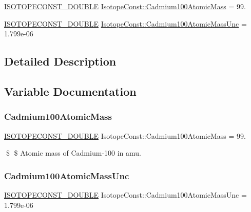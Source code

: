 \begin{DoxyCompactItemize}
\item 
\mbox{\hyperlink{group___isotope_const-_macros_ga8f45a7272ce02c0b4c65c44636ed719a}{I\+S\+O\+T\+O\+P\+E\+C\+O\+N\+S\+T\+\_\+\+D\+O\+U\+B\+LE}} \mbox{\hyperlink{group___isotope_const-_cadmium-_cd100_ga24c75fd2b6135de354e0e939f84f84c7}{Isotope\+Const\+::\+Cadmium100\+Atomic\+Mass}} = 99.
\item 
\mbox{\hyperlink{group___isotope_const-_macros_ga8f45a7272ce02c0b4c65c44636ed719a}{I\+S\+O\+T\+O\+P\+E\+C\+O\+N\+S\+T\+\_\+\+D\+O\+U\+B\+LE}} \mbox{\hyperlink{group___isotope_const-_cadmium-_cd100_gafed6788e654837514a60c0b6c419d575}{Isotope\+Const\+::\+Cadmium100\+Atomic\+Mass\+Unc}} = 1.\+799e-\/06
\end{DoxyCompactItemize}


\subsection{Detailed Description}


\subsection{Variable Documentation}
\mbox{\label{group___isotope_const-_cadmium-_cd100_ga24c75fd2b6135de354e0e939f84f84c7}} 
\subsubsection{\texorpdfstring{Cadmium100\+Atomic\+Mass}{Cadmium100AtomicMass}}
{\footnotesize\ttfamily \mbox{\hyperlink{group___isotope_const-_macros_ga8f45a7272ce02c0b4c65c44636ed719a}{I\+S\+O\+T\+O\+P\+E\+C\+O\+N\+S\+T\+\_\+\+D\+O\+U\+B\+LE}} Isotope\+Const\+::\+Cadmium100\+Atomic\+Mass = 99.}

\$ \$ Atomic mass of Cadmium-\/100 in amu. \mbox{\label{group___isotope_const-_cadmium-_cd100_gafed6788e654837514a60c0b6c419d575}} 
\subsubsection{\texorpdfstring{Cadmium100\+Atomic\+Mass\+Unc}{Cadmium100AtomicMassUnc}}
{\footnotesize\ttfamily \mbox{\hyperlink{group___isotope_const-_macros_ga8f45a7272ce02c0b4c65c44636ed719a}{I\+S\+O\+T\+O\+P\+E\+C\+O\+N\+S\+T\+\_\+\+D\+O\+U\+B\+LE}} Isotope\+Const\+::\+Cadmium100\+Atomic\+Mass\+Unc = 1.\+799e-\/06}

